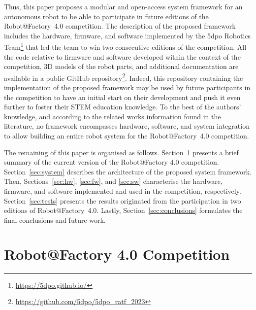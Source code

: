 \documentclass[conference]{IEEEtran}
\begin{document}
Thus, this paper proposes a modular and open-access system framework for an autonomous robot to be able to participate in future editions of the Robot@Factory~4.0 competition.
The description of the proposed framework includes the hardware, firmware, and software implemented by the 5dpo Robotics Team\footnote{\url{https://5dpo.github.io/}} that led the team to win two consecutive editions of the competition.
All the code relative to firmware and software developed within the context of the competition, 3D models of the robot parts, and additional documentation are available in a public GitHub repository\footnote{\label{note:repo}\url{https://github.com/5dpo/5dpo_ratf_2023}}.
Indeed, this repository containing the implementation of the proposed framework may be used by future participants in the competition to have an initial start on their development and push it even further to foster their STEM education knowledge.
To the best of the authors' knowledge, and according to the related works information found in the literature, no framework encompasses hardware, software, and system integration to allow building an entire robot system for the Robot@Factory~4.0 competition.


The remaining of this paper is organised as follows.
Section~\ref{sec:ratf} presents a brief summary of the current version of the Robot@Factory 4.0 competition.
Section~\ref{sec:system} describes the architecture of the proposed system framework.
Then, Sections~\ref{sec:hw}, \ref{sec:fw}, and \ref{sec:sw} characterise the hardware, firmware, and software implemented and used in the competition, respectively.
Section~\ref{sec:tests} presents the results originated from the participation in two editions of Robot@Factory~4.0.
Lastly, Section~\ref{sec:conclusions} formulates the final conclusions and future work.





\section{Robot@Factory 4.0 Competition}\label{sec:ratf}
\end{document}
